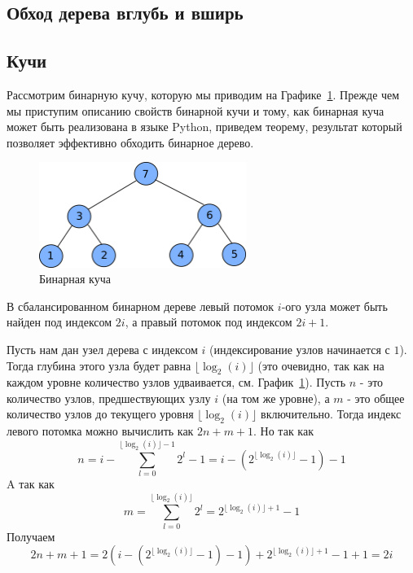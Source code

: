 \subsection{Обход дерева вглубь и вширь}

\subsection{Кучи}

Рассмотрим бинарную кучу, которую мы приводим на Графике~\ref{fig:binary_heap}.  
Прежде чем мы приступим описанию свойств бинарной кучи и тому, как бинарная куча может быть реализована в 
языке Python, приведем теорему, результат который позволяет эффективно обходить бинарное дерево. 

\begin{figure}
\centering
\includegraphics[width=0.6\textwidth]{graphics/binary_heap.png}
\caption{Бинарная куча}
\label{fig:binary_heap}
\end{figure}

\begin{theorem}
В сбалансированном бинарном дереве левый потомок $i$-ого узла может быть найден под 
индексом $2i$, а правый потомок под индексом $2i+1$.
\end{theorem}

Пусть нам дан узел дерева с индексом $i$ (индексирование узлов начинается с $1$). Тогда глубина этого узла 
будет равна $\lfloor \log_2(i) \rfloor$ (это очевидно, так как на каждом 
уровне количество узлов удваивается, см. График~\ref{fig:binary_heap}). Пусть $n$ - это количество узлов, 
предшествующих узлу $i$ (на том же уровне), а $m$ - это общее количество узлов
до текущего уровня $\lfloor \log_2(i) \rfloor$ включительно. Тогда индекс 
левого потомка можно вычислить как $2n + m+1$. Но так как
$$n = i - \sum_{l=0}^{\lfloor \log_2(i) \rfloor - 1} 2^l - 1 = i - (2^{\lfloor \log_2(i) \rfloor} - 1) - 1$$ 
A так как
$$m=\sum_{l=0}^{\lfloor \log_2(i) \rfloor} 2^l = 2^{\lfloor \log_2(i) \rfloor + 1} - 1$$
Получаем
$$2n+m+1= 2(i - (2^{\lfloor \log_2(i) \rfloor} - 1) - 1) + 2^{\lfloor \log_2(i) \rfloor + 1} - 1 + 1 = 2i$$ 

